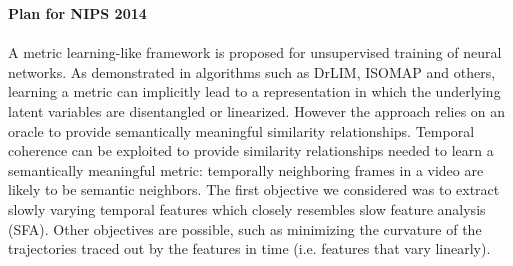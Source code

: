 \documentclass[12pt,a4paper]{report}
\begin{document}
\noindent
{\bf Plan for NIPS 2014} \\ \\ 
A metric learning-like framework is proposed for unsupervised training of neural networks. As demonstrated in algorithms such as DrLIM, ISOMAP and others, learning a metric can implicitly lead to a representation in which the underlying latent variables are disentangled or linearized. However the approach relies on an oracle to provide semantically meaningful similarity relationships. Temporal coherence can be exploited to provide similarity relationships needed to learn a semantically meaningful metric: temporally neighboring frames in a video are likely to be semantic neighbors. The first objective we considered was to extract slowly varying temporal features which closely resembles slow feature analysis (SFA). Other objectives are possible, such as minimizing the curvature of the trajectories traced out by the features in time (i.e. features that vary linearly). \\ 
\end{document}
